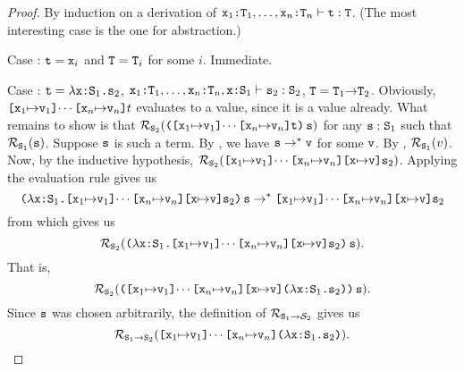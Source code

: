 \documentclass[11pt,twoside=off,numbers=noenddot]{scrbook}
\begin{document}
\begin{proof}
  By induction on a derivation of $\texttt{$\texttt{x}_1$:$\texttt{T}_1$},
  \dots, \texttt{$\texttt{x}_n$:$\texttt{T}_n$} \vdash \texttt{t} : \texttt{T}$.
  (The most interesting case is the one for abstraction.)

  Case : $\texttt{t} = \texttt{x}_i$ and $\texttt{T} = \texttt{T}_i$
  for some $i$. Immediate.

  Case : $\texttt{t} =
  \texttt{$\lambda$x:$\texttt{S}_1$.$\texttt{s}_2$}$, \quad
  $\texttt{$\texttt{x}_1$:$\texttt{T}_1$}, \dots,
  \texttt{$\texttt{x}_n$:$\texttt{T}_n$}, \texttt{$\texttt{x}$:$\texttt{S}_1$} \vdash
  \texttt{s}_2 : \texttt{S}_2$, \quad $\texttt{T} =
  \texttt{$\texttt{T}_1$$\rightarrow$$\texttt{T}_2$}$. Obviously,
  $\texttt{[$\texttt{x}_1$$\mapsto$$\texttt{v}_1$]$\cdots$[$\texttt{x}_n$$\mapsto$$\texttt{v}_n$]}t$
  evaluates to a value, since it is a value already. What remains to
  show is that
  $\mathcal{R}_{\texttt{S}_2}(\texttt{([$\texttt{x}_1$$\mapsto$$\texttt{v}_1$]$\cdots$[$\texttt{x}_n$$\mapsto$$\texttt{v}_n$]t)\,s})$
  for any $\texttt{s} : \texttt{S}_1$ such that
  $\mathcal{R}_{\texttt{S}_1}(\texttt{s})$. Suppose $\texttt{s}$ is such a
  term. By , we
  have $\texttt{s} \rightarrow^\ast \texttt{v}$ for some $\texttt{v}$. By
  ,
  $\mathcal{R}_{\texttt{S}_1}(v)$. Now, by the inductive hypothesis,
  $\mathcal{R}_{\texttt{S}_2}(\texttt{[$\texttt{x}_1$$\mapsto$$\texttt{v}_1$]$\cdots$[$\texttt{x}_n$$\mapsto$$\texttt{v}_n$][x$\mapsto$v]$\texttt{s}_2$})$.
  Applying the evaluation rule  gives us
  \[
    \texttt{($\lambda$x:$\texttt{S}_1$.[$\texttt{x}_1$$\mapsto$$\texttt{v}_1$]$\cdots$[$\texttt{x}_n$$\mapsto$$\texttt{v}_n$][x$\mapsto$v]$\texttt{s}_2$)\,s}
    \rightarrow^\ast
    \texttt{[$\texttt{x}_1$$\mapsto$$\texttt{v}_1$]$\cdots$[$\texttt{x}_n$$\mapsto$$\texttt{v}_n$][x$\mapsto$v]$\texttt{s}_2$}
  \]
  from which  gives us
  \[
    \mathcal{R}_{\texttt{S}_2}(\texttt{($\lambda$x:$\texttt{S}_1$.[$\texttt{x}_1$$\mapsto$$\texttt{v}_1$]$\cdots$[$\texttt{x}_n$$\mapsto$$\texttt{v}_n$][x$\mapsto$v]$\texttt{s}_2$)\,s}).
  \]
  That is,
  \[
    \mathcal{R}_{\texttt{S}_2}(\texttt{([$\texttt{x}_1$$\mapsto$$\texttt{v}_1$]$\cdots$[$\texttt{x}_n$$\mapsto$$\texttt{v}_n$][x$\mapsto$v]($\lambda$x:$\texttt{S}_1$.$\texttt{s}_2$))\,s}).
  \]
  Since $\texttt{s}$ was chosen arbitrarily, the definition of
  $\mathcal{R}_{\texttt{$\texttt{S}_1$$\rightarrow$$\mathcal{S}_2$}}$ gives us
  \[
    \mathcal{R}_{\texttt{$\texttt{S}_1$$\rightarrow$$\texttt{S}_2$}}(\texttt{[$\texttt{x}_1$$\mapsto$$\texttt{v}_1$]$\cdots$[$\texttt{x}_n$$\mapsto$$\texttt{v}_n$]($\lambda$x:$\texttt{S}_1$.$\texttt{s}_2$)}).
  \]


\end{proof}
\end{document}
